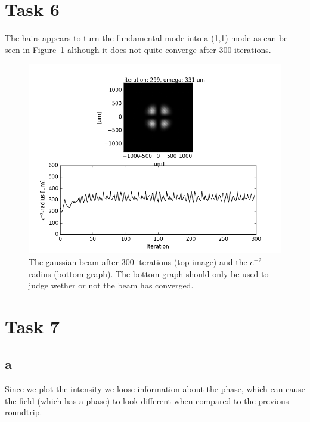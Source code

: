 \documentclass[12pt,a4paper]{article}
\begin{document}
\section{Task 6}\label{sec:6}
The hairs appears to turn the fundamental mode into a (1,1)-mode as can be seen in Figure~\ref{fig:task6} although it does not quite converge after 300 iterations.
\begin{figure}[ht!]
  \centering
  \includegraphics[width=\textwidth]{6_gauss_1_1.png}
  \caption{The gaussian beam after 300 iterations (top image) and the $e^{-2}$ radius (bottom graph). The bottom graph should only be used to judge wether or not the beam has converged.}
  \label{fig:task6}
\end{figure}

\section{Task 7}\label{sec:7}
\subsection{a}
Since we plot the intensity we loose information about the phase, which can cause the field (which has a phase) to look different when compared to the previous roundtrip.
\end{document}
